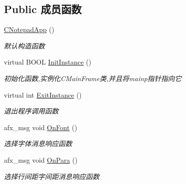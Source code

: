 \subsection*{Public 成员函数}
\begin{DoxyCompactItemize}
\item 
\mbox{\label{class_c_notepad_app_a829ed77997eb81496b815b50657ecb40}} 
\hyperlink{class_c_notepad_app_a829ed77997eb81496b815b50657ecb40}{C\+Notepad\+App} ()
\begin{DoxyCompactList}\small\item\em 默认构造函数 \end{DoxyCompactList}\item 
\mbox{\label{class_c_notepad_app_a31874d4fcf2e5120379146e61d8716d4}} 
virtual B\+O\+OL \hyperlink{class_c_notepad_app_a31874d4fcf2e5120379146e61d8716d4}{Init\+Instance} ()
\begin{DoxyCompactList}\small\item\em 初始化函数,实例化\+C\+Main\+Frame类,并且将mainp指针指向它 \end{DoxyCompactList}\item 
\mbox{\label{class_c_notepad_app_a07647790b646bc0be54fbf39e069ddcd}} 
virtual int \hyperlink{class_c_notepad_app_a07647790b646bc0be54fbf39e069ddcd}{Exit\+Instance} ()
\begin{DoxyCompactList}\small\item\em 退出程序调用函数 \end{DoxyCompactList}\item 
afx\+\_\+msg void \hyperlink{class_c_notepad_app_aa09334de95a65c56cdca8a682b006bb6}{On\+Font} ()
\begin{DoxyCompactList}\small\item\em 选择字体消息响应函数~\newline
\end{DoxyCompactList}\item 
afx\+\_\+msg void \hyperlink{class_c_notepad_app_a954649ecbb87fb8a001f2ed399440261}{On\+Para} ()
\begin{DoxyCompactList}\small\item\em 选择行间距字间距消息响应函数~\newline
\end{DoxyCompactList}\item 
\mbox{\label{class_c_notepad_app_a66c1b4a1e235017e0a5078438df97e7c}} 

\end{DoxyCompactItemize}
